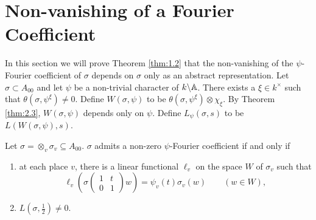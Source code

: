 \section{Non-vanishing of a Fourier Coefficient}
\label{sec:4}

In this section we will prove Theorem \ref{thm:1.2} that the non-vanishing of the $\psi$-Fourier coefficient of $\sigma$ depends on $\sigma$ only as an abstract representation.
Let $\sigma \subset A_{00}$ and let $\psi$ be a non-trivial character of $k \backslash \mathbb{A}$.
There exists a $\xi \in k^\times$ such that $\theta(\sigma, \psi^\xi) \neq 0$.
Define $W(\sigma, \psi)$ to be $\theta(\sigma, \psi^\xi) \otimes \chi_\xi$.
By Theorem \ref{thm:2.3}, $W(\sigma, \psi)$ depends only on $\psi$.
Define $L_\psi(\sigma, s)$ to be $L(W(\sigma, \psi), s)$.

\begin{theorem}
\label{thm:4.1}
Let $\sigma = \otimes_v \sigma_v \subseteq A_{00}$.
$\sigma$ admits a non-zero $\psi$-Fourier coefficient if and only if
\begin{enumerate}[label=(\roman*)]
    \item at each place $v$, there is a linear functional $\ell_v$ on the space $W$ of $\sigma_v$ such that
    \[
        \ell_v\left(\sigma\begin{pmatrix}
            1 & t \\ 0 & 1
        \end{pmatrix}w\right) = \psi_v(t) \sigma_v(w) \qquad (w \in W),
    \]
    \item $L(\sigma, \frac{1}{2}) \neq 0$.
\end{enumerate}
\end{theorem}

